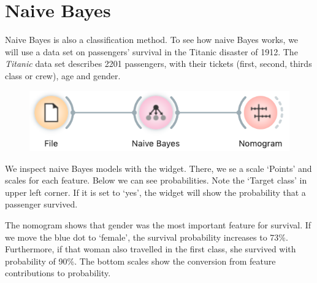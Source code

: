 \chapter{Naive Bayes}
\label{ch:naive_bayes}

Naive Bayes  is also a classification method. To see how naive Bayes works, we will use a data set on passengers’ survival in the Titanic disaster of 1912. The \textit{Titanic} data set describes 2201 passengers, with their tickets (first, second, thirds class or crew), age and gender.

\begin{figure}[h]
    \centering
    \vspace{-0.2cm}
    \includegraphics[scale=0.4]{graphics/ch-naive_bayes/workflow.png}
\end{figure}

We inspect naive Bayes models with the  widget. There, we se a scale ‘Points’ and scales for each feature. Below we can see probabilities. Note the ‘Target class’ in upper left corner. If it is set to ‘yes’, the widget will show the probability that a passenger survived.

The nomogram shows that gender was the most important feature for survival. If we move the blue dot to ‘female’, the survival probability increases to 73\%. Furthermore, if that woman also travelled in the first class, she survived with probability of 90\%. The bottom scales show the conversion from feature contributions to probability.

